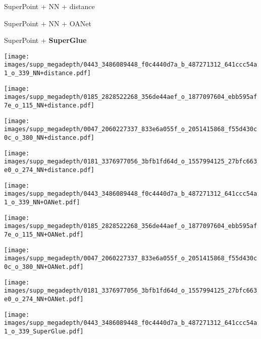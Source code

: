 \documentclass[10pt,twocolumn,letterpaper]{article}
\renewcommand{\*}[1]{\mathbf{#1}}
\renewcommand{\b}[1]{\textbf{#1}}
\newcommand{\0}{\phantom{0}}
\begin{document}
\begin{figure*}[ht!]
\centering
\def\iwidth{0.31}
\begin{minipage}{\iwidth\textwidth}
    \centering
    \small{SuperPoint + NN + distance}
\end{minipage}\hspace{1mm}\begin{minipage}{\iwidth\textwidth}
    \centering
    \small{SuperPoint + NN + OANet}
\end{minipage}\hspace{1mm}\begin{minipage}{\iwidth\textwidth}
    \centering
    \small{SuperPoint + \b{SuperGlue}}
\end{minipage}

\begin{minipage}{\iwidth\textwidth}
    \texttt{[image: images/supp\_megadepth/0443\_3486089448\_f0c4440d7a\_b\_487271312\_641ccc54a1\_o\_339\_NN+distance.pdf]}
    
    \vspace{.5mm}
    \texttt{[image: images/supp\_megadepth/0185\_2828522268\_356de44aef\_o\_1877097604\_ebb595af7e\_o\_115\_NN+distance.pdf]}
    
    \vspace{.5mm}
    \texttt{[image: images/supp\_megadepth/0047\_2060227337\_833e6a055f\_o\_2051415868\_f55d430c0c\_o\_380\_NN+distance.pdf]}
    
    \vspace{.5mm}
    \texttt{[image: images/supp\_megadepth/0181\_3376977056\_3bfb1fd64d\_o\_1557994125\_27bfc663e0\_o\_274\_NN+distance.pdf]}
\end{minipage}\hspace{1mm}\begin{minipage}{\iwidth\textwidth}
    \texttt{[image: images/supp\_megadepth/0443\_3486089448\_f0c4440d7a\_b\_487271312\_641ccc54a1\_o\_339\_NN+OANet.pdf]}
    
    \vspace{.5mm}
    \texttt{[image: images/supp\_megadepth/0185\_2828522268\_356de44aef\_o\_1877097604\_ebb595af7e\_o\_115\_NN+OANet.pdf]}
    
    \vspace{.5mm}
    \texttt{[image: images/supp\_megadepth/0047\_2060227337\_833e6a055f\_o\_2051415868\_f55d430c0c\_o\_380\_NN+OANet.pdf]}
    
    \vspace{.5mm}
    \texttt{[image: images/supp\_megadepth/0181\_3376977056\_3bfb1fd64d\_o\_1557994125\_27bfc663e0\_o\_274\_NN+OANet.pdf]}
\end{minipage}\hspace{1mm}\begin{minipage}{\iwidth\textwidth}
    \texttt{[image: images/supp\_megadepth/0443\_3486089448\_f0c4440d7a\_b\_487271312\_641ccc54a1\_o\_339\_SuperGlue.pdf]}
    

\end{minipage}
\end{figure*}
\end{document}
